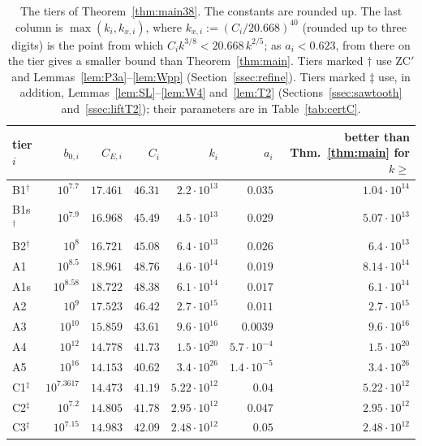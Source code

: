 \documentclass[11pt]{amsart}
\theoremstyle{definition}
\theoremstyle{remark}
\numberwithin{equation}{section}
\begin{document}
\begin{table}[ht]
\centering
\small
\begin{tabular}{lrrrrrr}
\toprule
tier $i$ & $b_{0,i}$ & $C_{E,i}$ & $C_i$ & $k_i$ & $a_i$ & better than Thm.~\ref{thm:main} for $k\ge$\\
\midrule
B1$^\dagger$ & $10^{7.7}$ & $17.461$ & $46.31$ & $2.2\cdot10^{13}$ & $0.035$ & $1.04\cdot10^{14}$\\
B1s$^\dagger$ & $10^{7.9}$ & $16.968$ & $45.49$ & $4.5\cdot10^{13}$ & $0.029$ & $5.07\cdot10^{13}$\\
B2$^\dagger$ & $10^{8}$ & $16.721$ & $45.08$ & $6.4\cdot10^{13}$ & $0.026$ & $6.4\cdot10^{13}$\\
A1 & $10^{8.5}$ & $18.961$ & $48.76$ & $4.6\cdot10^{14}$ & $0.019$ & $8.14\cdot10^{14}$\\
A1s & $10^{8.58}$ & $18.722$ & $48.38$ & $6.1\cdot10^{14}$ & $0.017$ & $6.1\cdot10^{14}$\\
A2 & $10^{9}$ & $17.523$ & $46.42$ & $2.7\cdot10^{15}$ & $0.011$ & $2.7\cdot10^{15}$\\
A3 & $10^{10}$ & $15.859$ & $43.61$ & $9.6\cdot10^{16}$ & $0.0039$ & $9.6\cdot10^{16}$\\
A4 & $10^{12}$ & $14.778$ & $41.73$ & $1.5\cdot10^{20}$ & $5.7\cdot10^{-4}$ & $1.5\cdot10^{20}$\\
A5 & $10^{16}$ & $14.153$ & $40.62$ & $3.4\cdot10^{26}$ & $1.4\cdot10^{-5}$ & $3.4\cdot10^{26}$\\
C1$^\ddagger$ & $10^{7.3617}$ & $14.473$ & $41.19$ & $5.22\cdot10^{12}$ & $0.04$ & $5.22\cdot10^{12}$\\
C2$^\ddagger$ & $10^{7.2}$ & $14.805$ & $41.78$ & $2.95\cdot10^{12}$ & $0.047$ & $2.95\cdot10^{12}$\\
C3$^\ddagger$ & $10^{7.15}$ & $14.983$ & $42.09$ & $2.48\cdot10^{12}$ & $0.05$ & $2.48\cdot10^{12}$\\
\bottomrule
\end{tabular}
\medskip
\caption{The tiers of Theorem~\ref{thm:main38}. The constants are rounded up. The last column is
$\max(k_i,k_{x,i})$, where $k_{x,i}:=(C_i/20.668)^{40}$ (rounded up to three digits) is the point from which
$C_ik^{3/8}<20.668\,k^{2/5}$; as $a_i<0.623$, from there on the tier gives a smaller bound than
Theorem~\ref{thm:main}.
Tiers marked $\dagger$ use ZC$'$ and Lemmas~\ref{lem:P3a}--\ref{lem:Wpp} (Section~\ref{ssec:refine}).
Tiers marked $\ddagger$ use, in addition, Lemmas~\ref{lem:SL}--\ref{lem:W4} and~\ref{lem:T2} (Sections~\ref{ssec:sawtooth}
and~\ref{ssec:liftT2}); their parameters are in Table~\ref{tab:certC}.
}\label{tab:tiers}
\end{table}
\end{document}
